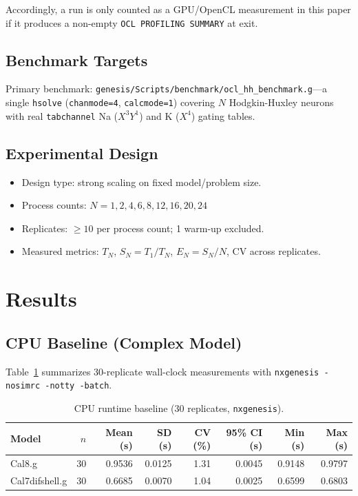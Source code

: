 \documentclass[11pt,a4paper]{article}
\begin{document}
Accordingly, a run is only counted as a GPU/OpenCL measurement in this paper if it produces a non-empty \texttt{OCL PROFILING SUMMARY} at exit.

\subsection{Benchmark Targets}

Primary benchmark: \texttt{genesis/Scripts/benchmark/ocl\_hh\_benchmark.g}---a single \texttt{hsolve} (\texttt{chanmode=4}, \texttt{calcmode=1}) covering $N$ Hodgkin-Huxley neurons with real \texttt{tabchannel} Na ($X^3Y^1$) and K ($X^4$) gating tables.

\subsection{Experimental Design}

\begin{itemize}[nosep]
  \item Design type: strong scaling on fixed model/problem size.
  \item Process counts: $N = 1, 2, 4, 6, 8, 12, 16, 20, 24$
  \item Replicates: $\geq 10$ per process count; 1 warm-up excluded.
  \item Measured metrics: $T_N$, $S_N = T_1/T_N$, $E_N = S_N/N$, CV across replicates.
\end{itemize}

\section{Results}

\subsection{CPU Baseline (Complex Model)}

Table~\ref{tab:cpu_baseline} summarizes 30-replicate wall-clock measurements with \texttt{nxgenesis -nosimrc -notty -batch}.

\begin{table}[H]
\centering
\caption{CPU runtime baseline (30 replicates, \texttt{nxgenesis}).}
\label{tab:cpu_baseline}
\begin{tabular}{lrrrrrrr}
\toprule
Model & $n$ & Mean (s) & SD (s) & CV (\%) & 95\% CI (s) & Min (s) & Max (s) \\
\midrule
Cal8.g          & 30 & 0.9536 & 0.0125 & 1.31 & 0.0045 & 0.9148 & 0.9797 \\
Cal7difshell.g  & 30 & 0.6685 & 0.0070 & 1.04 & 0.0025 & 0.6599 & 0.6803 \\
\bottomrule
\end{tabular}
\end{table}
\end{document}
